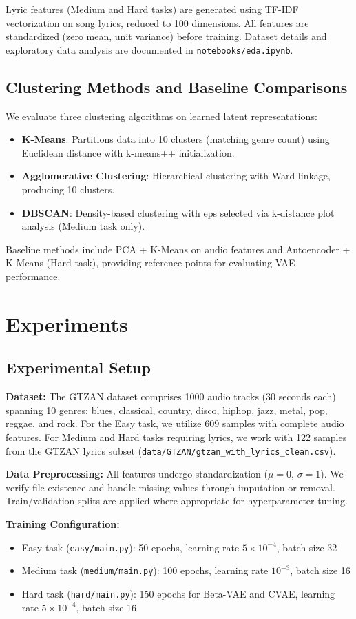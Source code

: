 \documentclass[11pt]{article}
\begin{document}
Lyric features (Medium and Hard tasks) are generated using TF-IDF vectorization on song lyrics, reduced to 100 dimensions. All features are standardized (zero mean, unit variance) before training. Dataset details and exploratory data analysis are documented in \texttt{notebooks/eda.ipynb}.

\subsection{Clustering Methods and Baseline Comparisons}
We evaluate three clustering algorithms on learned latent representations:
\begin{itemize}
\item \textbf{K-Means}: Partitions data into 10 clusters (matching genre count) using Euclidean distance with k-means++ initialization.
\item \textbf{Agglomerative Clustering}: Hierarchical clustering with Ward linkage, producing 10 clusters.
\item \textbf{DBSCAN}: Density-based clustering with eps selected via k-distance plot analysis (Medium task only).
\end{itemize}

Baseline methods include PCA + K-Means on audio features and Autoencoder + K-Means (Hard task), providing reference points for evaluating VAE performance.

\section{Experiments}
\subsection{Experimental Setup}
\textbf{Dataset:} The GTZAN dataset comprises 1000 audio tracks (30 seconds each) spanning 10 genres: blues, classical, country, disco, hiphop, jazz, metal, pop, reggae, and rock. For the Easy task, we utilize 609 samples with complete audio features. For Medium and Hard tasks requiring lyrics, we work with 122 samples from the GTZAN lyrics subset (\texttt{data/GTZAN/gtzan\_with\_lyrics\_clean.csv}).

\textbf{Data Preprocessing:} All features undergo standardization ($\mu=0$, $\sigma=1$). We verify file existence and handle missing values through imputation or removal. Train/validation splits are applied where appropriate for hyperparameter tuning.

\textbf{Training Configuration:} 
\begin{itemize}
\item Easy task (\texttt{easy/main.py}): 50 epochs, learning rate $5\times10^{-4}$, batch size 32
\item Medium task (\texttt{medium/main.py}): 100 epochs, learning rate $10^{-3}$, batch size 16
\item Hard task (\texttt{hard/main.py}): 150 epochs for Beta-VAE and CVAE, learning rate $5\times10^{-4}$, batch size 16
\end{itemize}
\end{document}
